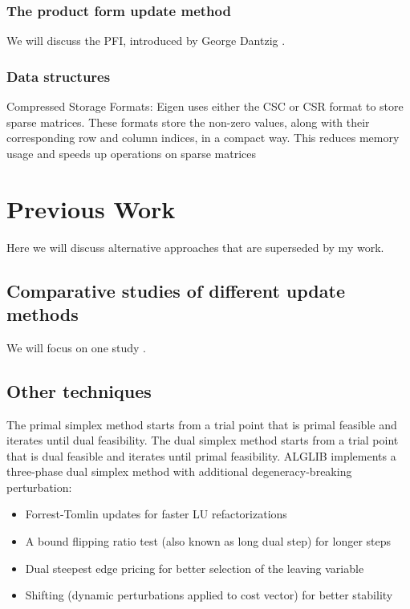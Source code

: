 \subsubsection*{The product form update method}
We will discuss the PFI, introduced by George Dantzig \parencite{dantzig1954product}.
\subsubsection*{Data structures}
Compressed Storage Formats:
Eigen uses either the CSC or CSR format to store sparse matrices. These formats store the non-zero values, along with their corresponding row and column indices, 
in a compact way. This reduces memory usage and speeds up operations on sparse matrices
\section{Previous Work}
Here we will discuss alternative approaches that are superseded by my work.
\subsection{Comparative studies of different update methods}
We will focus on one study \parencite{huangfu2015novel}.
\subsection{Other techniques}
The primal simplex method starts from a trial point that is primal feasible and iterates until dual feasibility.
The dual simplex method starts from a trial point that is dual feasible and iterates until primal feasibility.
ALGLIB implements a three-phase dual simplex method with additional degeneracy-breaking perturbation:
\begin{itemize}
    \item Forrest-Tomlin updates for faster LU refactorizations
    \item A bound flipping ratio test (also known as long dual step) for longer steps
    \item Dual steepest edge pricing for better selection of the leaving variable
    \item Shifting (dynamic perturbations applied to cost vector) for better stability
\end{itemize}
